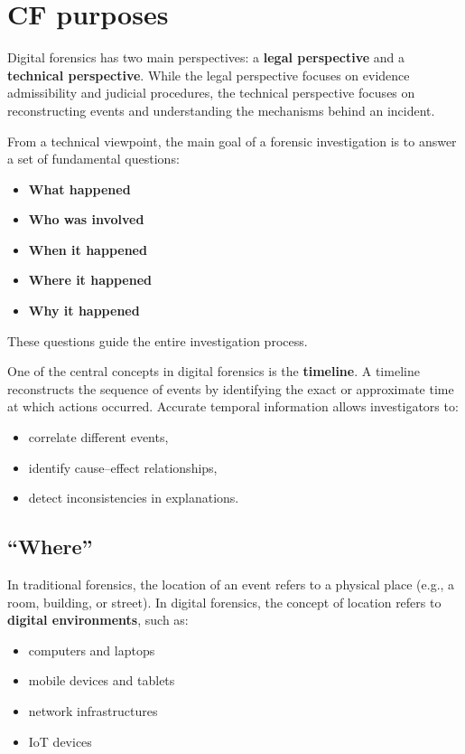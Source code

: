 
\section{CF purposes}

Digital forensics has two main perspectives: a \textbf{legal perspective} and a \textbf{technical perspective}.  
While the legal perspective focuses on evidence admissibility and judicial procedures, the technical perspective focuses on reconstructing events and understanding the mechanisms behind an incident.
\medskip

\noindent
From a technical viewpoint, the main goal of a forensic investigation is to answer a set of fundamental questions:

\begin{itemize}
\item \textbf{What happened}
\item \textbf{Who was involved}
\item \textbf{When it happened}
\item \textbf{Where it happened}
\item \textbf{Why it happened}
\end{itemize}
\noindent
These questions guide the entire investigation process.

\bigskip

\noindent
One of the central concepts in digital forensics is the \textbf{timeline}.  
A timeline reconstructs the sequence of events by identifying the exact or approximate time at which actions occurred.
\noindent
Accurate temporal information allows investigators to:
\begin{itemize}
\item correlate different events,
\item identify cause–effect relationships,
\item detect inconsistencies in explanations.
\end{itemize}

\subsection {``Where''}

In traditional forensics, the location of an event refers to a physical place (e.g., a room, building, or street).  
In digital forensics, the concept of location refers to \textbf{digital environments}, such as:

\begin{itemize}
\item computers and laptops
\item mobile devices and tablets
\item network infrastructures
\item IoT devices
\end{itemize}

